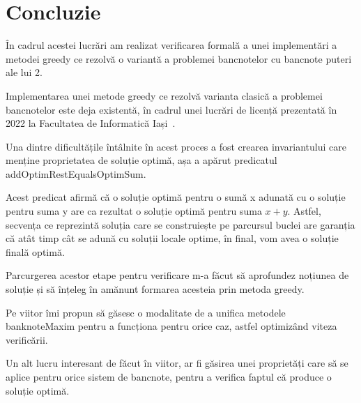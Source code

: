 \chapter*{Concluzie} 

În cadrul acestei lucrări am realizat verificarea formală a unei implementări a metodei greedy ce rezolvă o variantă a 
problemei bancnotelor cu bancnote puteri ale lui 2.\par
Implementarea unei metode greedy ce rezolvă varianta clasică a problemei bancnotelor este deja existentă, în cadrul unei lucrări de 
licență prezentată în 2022 la Facultatea de Informatică Iași~\cite{elisa:1}.\par
Una dintre dificultățile întâlnite în acest proces a fost crearea invariantului care menține proprietatea de soluție
optimă, așa a apărut predicatul addOptimRestEqualsOptimSum.\par
Acest predicat afirmă că o soluție optimă pentru o sumă x adunată cu o soluție pentru suma y are ca rezultat o 
soluție optimă pentru suma $x+y$. Astfel, secvența ce reprezintă soluția care se construiește pe parcursul buclei 
are garanția că atât timp cât se adună cu soluții locale optime, în final, vom avea o soluție finală optimă.\par
Parcurgerea acestor etape pentru verificare m-a făcut să aprofundez noțiunea de soluție și să înțeleg în amănunt 
formarea acesteia prin metoda greedy.\par
Pe viitor îmi propun să găsesc o modalitate de a unifica metodele banknoteMaxim pentru a funcționa pentru orice caz, 
astfel optimizând viteza verificării.\par
Un alt lucru interesant de făcut în viitor, ar fi găsirea unei proprietăți care să se aplice pentru orice sistem 
de bancnote, pentru a verifica faptul că produce o soluție optimă.
 
